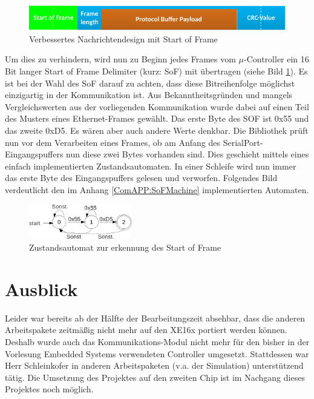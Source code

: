 \paragraph{}
\begin{figure}
  \includegraphics[width=\textwidth]{MessageFormat_enhanced}
  \caption{Verbessertes Nachrichtendesign mit Start of Frame}
  \label{fig:FrameEnhanced}
\end{figure}
Um dies zu verhindern, wird nun zu Beginn jedes Frames vom $\mu$-Controller ein 16 Bit langer Start of Frame Delimiter (kurz: SoF) mit übertragen (siehe Bild \ref{fig:FrameEnhanced}). Es ist bei der Wahl des SoF darauf zu achten, dass diese Bitreihenfolge möglichst einzigartig in der Kommunikation ist. Aus Bekanntheitsgründen und mangels Vergleichswerten aus der vorliegenden Kommunikation wurde dabei auf einen Teil des Musters eines Ethernet-Frames gewählt. Das erste Byte des SOF ist 0x55 und das zweite 0xD5. Es wären aber auch andere Werte denkbar. Die Bibliothek prüft nun vor dem Verarbeiten eines Frames, ob am Anfang des SerialPort-Eingangspuffers nun diese zwei Bytes vorhanden sind. Dies geschieht mittels eines einfach implementierten Zustandsautomaten. In einer Schleife wird nun immer das erste Byte des Eingangspuffers gelesen und verworfen. Folgendes Bild verdeutlicht den im Anhang \ref{ComAPP:SoFMachine} implementierten Automaten.
\begin{figure}
  \centering
  \includegraphics[width=0.4\textwidth]{Automat}
  \caption{Zustandsautomat zur erkennung des Start of Frame}
  \label{fig:Machine}
\end{figure}
\section{Ausblick}
Leider war bereits ab der Hälfte der Bearbeitungszeit absehbar, dass die anderen Arbeitspakete zeitmäßig nicht mehr auf den XE16x portiert werden können. Deshalb wurde auch das Kommunikations-Modul nicht mehr für den bisher in der Vorlesung Embedded Systems verwendeten Controller umgesetzt. Stattdessen war Herr Schleinkofer in anderen Arbeitspaketen (v.a. der Simulation) unterstützend tätig. Die Umsetzung des Projektes auf den zweiten Chip ist im Nachgang dieses Projektes noch möglich.
